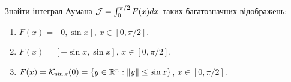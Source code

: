 
\begin{problem}
    Знайти інтеграл Аумана $\mathcal{J} = \int_0^{\pi/2} F(x) dx$ таких багатозначних відображень:
    \begin{enumerate}
        \item $F(x) = [0, \sin x]$, $x \in [0, \pi / 2]$.
        \item $F(x) = [-\sin x, \sin x]$, $x \in [0, \pi / 2]$.
        \item $F(x) = \mathcal{K}_{\sin x}(0) = \{ y \in \mathbb{R}^n : \| y \| \le \sin x \}$, $x \in [0, \pi / 2]$.
    \end{enumerate}
\end{problem}


